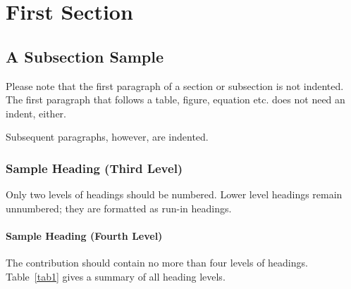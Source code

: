 \documentclass[runningheads]{llncs}
\begin{document}







\section{First Section}
\subsection{A Subsection Sample}
Please note that the first paragraph of a section or subsection is
not indented. The first paragraph that follows a table, figure,
equation etc. does not need an indent, either.

Subsequent paragraphs, however, are indented.

\subsubsection{Sample Heading (Third Level)} Only two levels of
headings should be numbered. Lower level headings remain unnumbered;
they are formatted as run-in headings.

\paragraph{Sample Heading (Fourth Level)}
The contribution should contain no more than four levels of
headings. Table~\ref{tab1} gives a summary of all heading levels.
\end{document}
